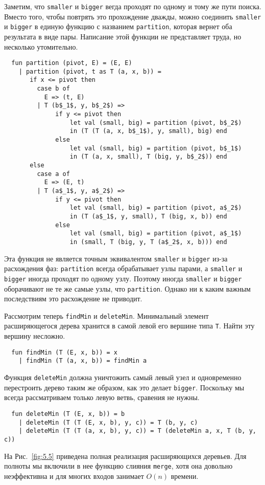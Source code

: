 Заметим, что \lstinline!smaller! и \lstinline!bigger! вегда проходят
по одному и тому же пути поиска. Вместо того, чтобы повтрять это
прохождение дважды, можно соединить \lstinline!smaller! и
\lstinline!bigger! в единую функцию с названием \lstinline!partition!,
которая вернет оба результата в виде пары.  Написание этой функции не
представляет труда, но несколько утомительно.
\begin{lstlisting}
  fun partition (pivot, E) = (E, E)
    | partition (pivot, t as T (a, x, b)) =
       if x <= pivot then
         case b of
           E => (t, E)
         | T (b$_1$, y, b$_2$) =>
              if y <= pivot then
                  let val (small, big) = partition (pivot, b$_2$)
                  in (T (T (a, x, b$_1$), y, small), big) end
              else
                  let val (small, big) = partition (pivot, b$_1$)
                  in (T (a, x, small), T (big, y, b$_2$)) end
       else
         case a of
           E => (E, t)
         | T (a$_1$, y, a$_2$) =>
              if y <= pivot then
                  let val (small, big) = partition (pivot, a$_2$)
                  in (T (a$_1$, y, small), T (big, x, b)) end
              else
                  let val (small, big) = partition (pivot, a$_1$)
                  in (small, T (big, y, T (a$_2$, x, b))) end         
\end{lstlisting}

\begin{remark}
  Эта функция не является точным эквивалентом \lstinline!smaller! и
  \lstinline!bigger! из-за расхождения фаз: \lstinline!partition!
  всегда обрабатывает узлы парами, а \lstinline!smaller! и
  \lstinline!bigger! иногда проходят по одному узлу.  Поэтому иногда
  \lstinline!smaller! и \lstinline!bigger! оборачивают не те же самые
  узлы, что \lstinline!partition!. Однако ни к каким важным
  последствиям это расхождение не приводит.
\end{remark}

Рассмотрим теперь \lstinline!findMin! и
\lstinline!deleteMin!. Минимальный элемент расширяющегося дерева
хранится в самой левой его вершине типа \lstinline!T!. Найти эту
вершину несложно.
\begin{lstlisting}
  fun findMin (T (E, x, b)) = x
    | findMin (T (a, x, b)) = findMin a
\end{lstlisting}
Функция \lstinline!deleteMin! должна уничтожить самый левый узел и
одновременно перестроить дерево таким же образом, как это делает
\lstinline!bigger!. Поскольку мы всегда рассматриваем только левую
ветвь, сравения не нужны.
\begin{lstlisting}
  fun deleteMin (T (E, x, b)) = b
    | deleteMin (T (T (E, x, b), y, c)) = T (b, y, c)
    | deleteMin (T (T (a, x, b), y, c)) = T (deleteMin a, x, T (b, y, c))
\end{lstlisting}
На Рис.~\ref{fig:5.5} приведена полная реализация расширяющихся
деревьев. Для полноты мы включили в нее функцию слияния
\lstinline!merge!, хотя она довольно неэффективна и для многих входов
занимает $O(n)$ времени.

